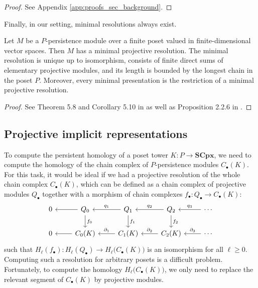 \documentclass[english,a4paper,nolineno,cleveref]{socg-lipics-v2021}
\begin{document}
\begin{proof}
See Appendix \ref{app:proofs_sec_background}.
\end{proof}


Finally, in our setting, minimal resolutions always exist.

\begin{proposition} \label{prop:existence_minimal_resolutions}
Let $M$ be a $P$-persistence module over a finite poset valued in finite-dimensional vector spaces. Then $M$ has a minimal projective resolution. The minimal resolution is unique up to isomorphism, consists of finite direct sums of elementary projective modules, and its length is bounded by the longest chain in the poset $P$. Moreover, every minimal presentation is the restriction of a minimal projective resolution. 
\end{proposition}

\begin{proof}
See Theorem 5.8 and Corollary 5.10 in \cite{assem2006elements} as well as Proposition 2.2.6 in \cite{ROGNERUD2021107885}.
\end{proof}


\subsection{Projective implicit representations}

To compute the persistent homology of a poset tower $K\colon P\rightarrow \mathbf{SCpx}$, we need to compute the homology of the chain complex of $P$-persistence modules $C_\bullet(K)$. For this task, it would be ideal if we had a projective resolution of the whole chain complex $C_\bullet(K)$, which can be defined as a chain complex of projective modules $Q_\bullet$ together with a morphism of chain complexes $f_\bullet\colon Q_\bullet\rightarrow C_\bullet(K)$:
\begin{equation*}
\begin{tikzcd}
0 & Q_0 \arrow[l] \arrow[d,"f_0"] & Q_1 \arrow[l,swap,"q_1"] \arrow[d,"f_1"] & Q_2 \arrow[l,swap,"q_2"] \arrow[d,"f_2"] & \cdots \arrow[l,swap,"q_3"] \\
0 & C_0(K) \arrow[l] & C_1(K) \arrow[l,swap,"\partial_1"] & C_2(K) \arrow[l,swap,"\partial_2"] & \cdots \arrow[l,swap,"\partial_3"] 
\end{tikzcd}
\end{equation*}
such that $H_\ell(f_\bullet)\colon H_\ell(Q_\bullet)\rightarrow H_\ell\big(C_\bullet(K)\big)$ is an isomorphism for all $\ell\geq 0$. Computing such a resolution for arbitrary posets is a difficult problem. Fortunately, to compute the homology $H_\ell\big(C_\bullet(K)\big)$, we only need to replace the relevant segment of $C_\bullet(K)$ by projective modules. 
\end{document}
